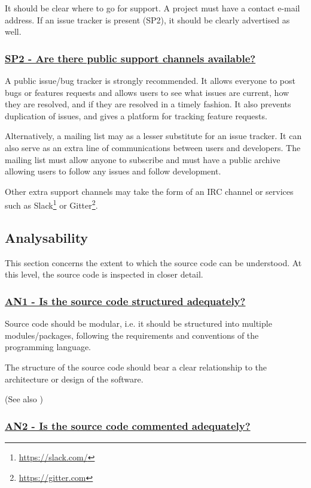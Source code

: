 \documentclass[a4paper,11pt]{article}
\newcommand{\criterion}[2]{\subsubsection*{\underline{#1 - #2}}\label{id:#1}}
\newcommand\CheckTable{%
  \begin{tabular}{ccccc}
    No & Minimal & Adequate & Good & Perfect \\
    0 & 1 & 2 & 3 & 4 \\
    \hline
    $\square$ & $\square$ & $\square$ & $\square$ & $\square$ \\
  \end{tabular}%
}
\newcommand{\refcrit}[1]{%
 \framebox[1.1\width]{\hyperref[id:#1]{#1}}
}
\begin{document}
It should be clear where to go for support. A project must have a contact
e-mail address. If an issue tracker is present (SP2), it should be clearly advertised
as well.


\newcommand{\spTwoID}{SP2}
\newcommand{\spTwoText}{Are there public support channels available?}
\criterion{\spTwoID}{\spTwoText}

A public issue/bug tracker is strongly recommended. It allows everyone to post
bugs or features requests and allows users to see what issues are current, how
they are resolved, and if they are resolved in a timely fashion. It also
prevents duplication of issues, and gives a platform for
tracking feature requests.

Alternatively, a mailing list may as a lesser substitute for an issue tracker.
It can also serve as an extra line of communications between users
and developers. The mailing list must allow anyone to subscribe and must have a
public archive allowing users to follow any issues and follow development.

Other extra support channels may take the form of an IRC channel or services
such as Slack\footnote{\url{https://slack.com/}} or
Gitter\footnote{\url{https://gitter.com}}.


\subsection{Analysability}\label{sec:ana}

This section concerns the extent to which the source code can be understood. At
this level, the source code is inspected in closer detail.

\newcommand{\anOneID}{AN1}
\newcommand{\anOneText}{Is the source code structured adequately?}
\criterion{\anOneID}{\anOneText}

Source code should be modular, i.e. it should be structured into multiple
modules/packages, following the requirements and conventions of the programming
language. 

The structure of the source code should bear a clear relationship to the
architecture or design of the software.

(See also \refcrit{R3})


\newcommand{\anTwoID}{AN2}
\newcommand{\anTwoText}{Is the source code commented adequately?}
\criterion{\anTwoID}{\anTwoText}
\end{document}
